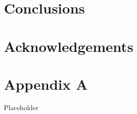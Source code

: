 \documentclass[11pt,oneside]{book}
\begin{document}
\chapter{Conclusions}
\label{chap:Conclusions}

\chapter{Acknowledgements}
\label{chap:Acknowledgements}



\appendix

\chapter{Appendix A}

Placeholder
\end{document}
